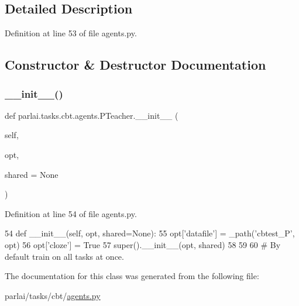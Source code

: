 \subsection{Detailed Description}


Definition at line 53 of file agents.\+py.



\subsection{Constructor \& Destructor Documentation}
\mbox{\label{classparlai_1_1tasks_1_1cbt_1_1agents_1_1PTeacher_a8433c2ae6d5202b4646baa3db9fbeb38}} 
\subsubsection{\texorpdfstring{\+\_\+\+\_\+init\+\_\+\+\_\+()}{\_\_init\_\_()}}
{\footnotesize\ttfamily def parlai.\+tasks.\+cbt.\+agents.\+P\+Teacher.\+\_\+\+\_\+init\+\_\+\+\_\+ (\begin{DoxyParamCaption}\item[{}]{self,  }\item[{}]{opt,  }\item[{}]{shared = {\ttfamily None} }\end{DoxyParamCaption})}



Definition at line 54 of file agents.\+py.


\begin{DoxyCode}
54     \textcolor{keyword}{def }\_\_init\_\_(self, opt, shared=None):
55         opt[\textcolor{stringliteral}{'datafile'}] = \_path(\textcolor{stringliteral}{'cbtest\_P'}, opt)
56         opt[\textcolor{stringliteral}{'cloze'}] = \textcolor{keyword}{True}
57         super().\_\_init\_\_(opt, shared)
58 
59 
60 \textcolor{comment}{# By default train on all tasks at once.}
\end{DoxyCode}


The documentation for this class was generated from the following file\+:\begin{DoxyCompactItemize}
\item 
parlai/tasks/cbt/\hyperlink{parlai_2tasks_2cbt_2agents_8py}{agents.\+py}\end{DoxyCompactItemize}

